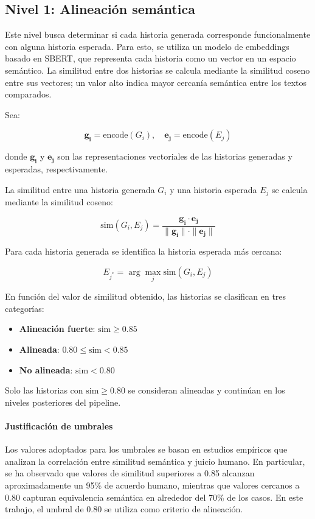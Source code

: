 \subsection{Nivel 1: Alineación semántica}
Este nivel busca determinar si cada historia generada corresponde funcionalmente con alguna historia esperada. Para esto, se utiliza un modelo de embeddings basado en SBERT, que representa cada historia como un vector en un espacio semántico. La similitud entre dos historias
se calcula mediante la similitud coseno entre sus vectores; un valor alto indica
mayor cercanía semántica entre los textos comparados.

Sea:

\[
\mathbf{g_i} = \text{encode}(G_i), \quad
\mathbf{e_j} = \text{encode}(E_j)
\]

donde $\mathbf{g_i}$ y $\mathbf{e_j}$ son las representaciones vectoriales
de las historias generadas y esperadas, respectivamente.

La similitud entre una historia generada $G_i$ y una historia esperada $E_j$
se calcula mediante la similitud coseno:

\[
\text{sim}(G_i, E_j) =
\frac{\mathbf{g_i} \cdot \mathbf{e_j}}
{\|\mathbf{g_i}\| \cdot \|\mathbf{e_j}\|}
\]

Para cada historia generada se identifica la historia esperada más cercana:

\[
E_{j^*} = \arg\max_j \text{sim}(G_i, E_j)
\]

En función del valor de similitud obtenido, las historias se clasifican en
tres categorías:

\begin{itemize}
\item \textbf{Alineación fuerte}: $\text{sim} \geq 0.85$
\item \textbf{Alineada}: $0.80 \leq \text{sim} < 0.85$
\item \textbf{No alineada}: $\text{sim} < 0.80$
\end{itemize}

Solo las historias con $\text{sim} \geq 0.80$ se consideran alineadas y
continúan en los niveles posteriores del pipeline.

\paragraph{Justificación de umbrales}
Los valores adoptados para los umbrales se basan en estudios empíricos que analizan la
correlación entre similitud semántica y juicio humano. En particular, se ha
observado que valores de similitud superiores a 0.85 alcanzan aproximadamente
un 95\% de acuerdo humano, mientras que valores cercanos a 0.80 capturan
equivalencia semántica en alrededor del 70\% de los casos.
En este trabajo, el umbral de 0.80 se utiliza como criterio de
alineación.

